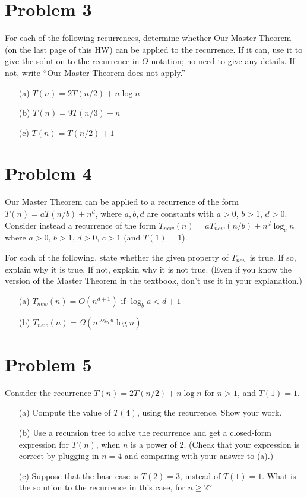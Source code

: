\documentclass{article}
\begin{document}
\section*{Problem 3}
For each of the following recurrences, determine whether Our Master Theorem (on the last page of this HW) can be applied to the recurrence. If it can, use it to give the solution to the recurrence in $\Theta$ notation; no need to give any details. If not, write “Our Master Theorem does not apply.”

\begin{enumerate}
    \item[(a)] $T(n) = 2T(n/2) + n \log n$
    \item[(b)] $T(n) = 9T(n/3) + n$
    \item[(c)] $T(n) = T(n/2) + 1$
\end{enumerate}

\section*{Problem 4}
Our Master Theorem can be applied to a recurrence of the form $T(n) = aT(n/b) + n^d$, where $a, b, d$ are constants with $a > 0$, $b > 1$, $d > 0$. Consider instead a recurrence of the form $T_{new}(n) = aT_{new}(n/b) + n^d \log_c n$ where $a > 0$, $b > 1$, $d > 0$, $c > 1$ (and $T(1) = 1$).

For each of the following, state whether the given property of $T_{new}$ is true. If so, explain why it is true. If not, explain why it is not true. (Even if you know the version of the Master Theorem in the textbook, don’t use it in your explanation.)

\begin{enumerate}
    \item[(a)] $T_{new}(n) = O(n^{d+1})$ if $\log_b a < d+1$
    \item[(b)] $T_{new}(n) = \Omega(n^{\log_b a} \log n)$
\end{enumerate}

\section*{Problem 5}
Consider the recurrence $T(n) = 2T(n/2) + n \log n$ for $n > 1$, and $T(1) = 1$.

\begin{enumerate}
    \item[(a)] Compute the value of $T(4)$, using the recurrence. Show your work.
    \item[(b)] Use a recursion tree to solve the recurrence and get a closed-form expression for $T(n)$, when $n$ is a power of 2. (Check that your expression is correct by plugging in $n = 4$ and comparing with your answer to (a).)
    \item[(c)] Suppose that the base case is $T(2) = 3$, instead of $T(1) = 1$. What is the solution to the recurrence in this case, for $n \ge 2$?
\end{enumerate}
\end{document}
